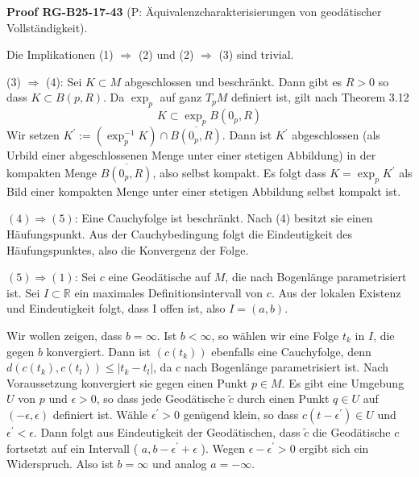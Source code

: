 \documentclass[10pt, letterpaper]{article}
\newcommand{\CustomHeading}[3]{%
  \par\medskip\noindent%
  \textbf{#1 #2} \textnormal{(#3)}.\enskip%
}
\newenvironment{PROOF}[2]{\begin{unitbox}\CustomHeading{Proof}{#1}{#2}}{\end{unitbox}}
\begin{document}
\begin{PROOF}{RG-B25-17-43}{P: Äquivalenzcharakterisierungen von geodätischer Vollständigkeit}
Die Implikationen (1) $\Longrightarrow$ (2) und (2) $\Longrightarrow$ (3) sind trivial.

(3) $\Longrightarrow$ (4): Sei $K \subset M$ abgeschlossen und beschränkt. Dann gibt es $R>0$ so dass $K \subset B(p, R)$. Da $\exp _{p}$ auf ganz $T_{p} M$ definiert ist, gilt nach Theorem 3.12
$$
K \subset \exp _{p} B\left(0_{p}, R\right)
$$
Wir setzen $K^{\prime}:=\left(\exp _{p}^{-1} K\right) \cap \overline{B\left(0_{p}, R\right)}$. Dann ist $K^{\prime}$ abgeschlossen (als Urbild einer abgeschlossenen Menge unter einer stetigen Abbildung) in der kompakten Menge $\overline{B\left(0_{p}, R\right)}$, also selbst kompakt. Es folgt dass $K=\exp _{p} K^{\prime}$ als Bild einer kompakten Menge unter einer stetigen Abbildung selbst kompakt ist.

$(4) \Longrightarrow(5)$: Eine Cauchyfolge ist beschränkt. Nach (4) besitzt sie einen Häufungspunkt. Aus der Cauchybedingung folgt die Eindeutigkeit des Häufungspunktes, also die Konvergenz der Folge.


$(5) \Longrightarrow(1)$: Sei $c$ eine Geodätische auf $M$, die nach Bogenlänge parametrisiert ist. Sei $I \subset \mathbb{R}$ ein maximales Definitionsintervall von $c$. Aus der lokalen Existenz und Eindeutigkeit folgt, dass I offen ist, also $I=(a, b)$.

Wir wollen zeigen, dass $b=\infty$. Ist $b<\infty$, so wählen wir eine Folge $t_{k}$ in $I$, die gegen $b$ konvergiert. Dann ist $\left(c\left(t_{k}\right)\right)$ ebenfalls eine Cauchyfolge, denn $d\left(c\left(t_{k}\right), c\left(t_{l}\right)\right) \leq\left|t_{k}-t_{l}\right|$, da $c$ nach Bogenlänge parametrisiert ist. Nach Voraussetzung konvergiert sie gegen einen Punkt $p \in M$. Es gibt eine Umgebung $U$ von $p$ und $\epsilon>0$, so dass jede Geodätische $\tilde{c}$ durch einen Punkt $q \in U$ auf $(-\epsilon, \epsilon)$ definiert ist. Wähle $\epsilon^{\prime}>0$ genügend klein, so dass $c\left(t-\epsilon^{\prime}\right) \in U$ und $\epsilon^{\prime}<\epsilon$. Dann folgt aus Eindeutigkeit der Geodätischen, dass $\tilde{c}$ die Geodätische $c$ fortsetzt auf ein Intervall ( $a, b-\epsilon^{\prime}+\epsilon$ ). Wegen $\epsilon-\epsilon^{\prime}>0$ ergibt sich ein Widerspruch. Also ist $b=\infty$ und analog $a=-\infty$.
\end{PROOF}



\pagebreak
\end{document}
